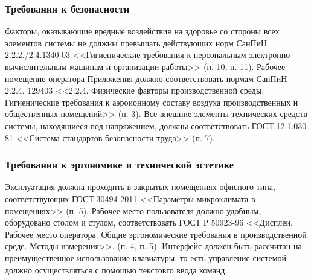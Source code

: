 \documentclass[12pt,a4paper]{article}
\begin{document}


\subsubsection{Требования к безопасности}\label{safety}
Факторы, оказывающие вредные воздействия на здоровье со стороны всех элементов системы не должны превышать 
действующих норм СанПиН 2.2.2./2.4.1340-03 <<Гигиенические требования к персональным 
электронно-вычислительным машинам и организации работы>> (п. 10, п. 11). \medskip \newline
Рабочее помещение оператора Приложения должно соответствовать нормам СанПиН 2.2.4. 129403 <<2.2.4. Физические
факторы производственной среды. Гигиенические требования к аэроионному составу воздуха производственных и общественных
помещений>> (п. 3). \medskip \newline
Все внешние элементы технических средств системы, находящиеся под напряжением, должны соответствовать 
ГОСТ 12.1.030-81 <<Система стандартов безопасности труда>> (п. 7).

\subsubsection{Требования к эргономике и технической эстетике} \label{ergo}
\noindent Эксплуатация должна проходить в закрытых помещениях офисного типа, соответствующих ГОСТ 30494-2011
<<Параметры микроклимата в помещениях>> (п. 5). \medskip \newline
Рабочее место пользователя должно удобным, оборудовано столом и стулом, соответствовать ГОСТ Р 50923-96
<<Дисплеи. Рабочее место оператора. Общие эргономические требования в производственной среде. Методы измерения>>.
(п. 4, п. 5). \medskip \newline
Интерфейс должен быть рассчитан на преимущественное использование клавиатуры, то есть управление системой должно осуществляться с помощью текстовго ввода команд. 
\end{document}
